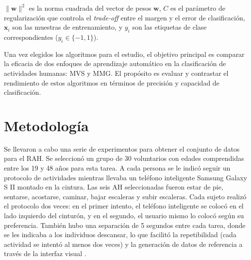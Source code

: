 \documentclass{esannV2}
\begin{document}
 \( \| \mathbf{w} \|^2 \) es la norma cuadrada del vector de pesos \( \mathbf{w} \), \( C \) es el parámetro de regularización que controla el \textit{trade-off} entre el margen y el error de clasificación, \( \mathbf{x}_i \) son las muestras de entrenamiento, y \( y_i \) son las etiquetas de clase correspondientes (\( y_i \in \{-1, 1\} \)).

Una vez elegidos los algoritmos para el estudio, el objetivo principal es comparar la eficacia de dos enfoques de aprendizaje automático en la clasificación de actividades humanas: MVS y MMG. El propósito es evaluar y contrastar el rendimiento de estos algoritmos en términos de precisión y capacidad de clasificación.


\section{Metodología}
Se llevaron a cabo una serie de experimentos para obtener el conjunto de datos para el RAH. Se seleccionó un grupo de 30 voluntarios con edades comprendidas entre los 19 y 48 años para esta tarea. A cada persona se le indicó seguir un protocolo de actividades mientras llevaba un teléfono inteligente Samsung Galaxy S II montado en la cintura. Las seis AH seleccionadas fueron estar de pie, sentarse, acostarse, caminar, bajar escaleras y subir escaleras. Cada sujeto realizó el protocolo dos veces: en el primer intento, el teléfono inteligente se colocó en el lado izquierdo del cinturón, y en el segundo, el usuario mismo lo colocó según su preferencia. También hubo una separación de 5 segundos entre cada tarea, donde se les indicaba a los individuos descansar, lo que facilitó la repetibilidad (cada actividad se intentó al menos dos veces) y la generación de datos de referencia a través de la interfaz visual \cite{esann2013}.
\end{document}
